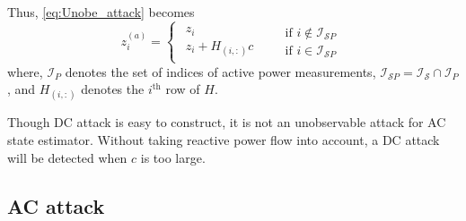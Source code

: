 \documentclass[twocolumn,english,final,journal]{IEEEtran}
\theoremstyle{plain}
\theoremstyle{definition}
\begin{document}
Thus, \eqref{eq:Unobe_attack} becomes
\begin{equation}
z_{i}^{(a)}=\begin{cases}
\begin{array}{c}
z_{i}\qquad\;\quad\;\qquad\\
z_{i}+H_{(i,:)}c
\end{array} & \begin{array}{c}
\mbox{if }i\notin\mathcal{I}_{\mathcal{S}P}\\
\mbox{if }i\in\mathcal{I}_{\mathcal{S}P}
\end{array}\end{cases}\label{eq:DC_attack}
\end{equation}
where, $\mathcal{I}_{P}$ denotes the set of indices of active power
measurements, $\mathcal{I}_{\mathcal{S}P}=\mathcal{I}_{\mathcal{S}}\cap\mathcal{I}_{P}$,
and $H_{(i,:)}$ denotes the $i^{\mbox{th}}$ row of $H$.

Though DC attack is easy to construct, it is not an unobservable attack
for AC state estimator. Without taking reactive power flow into account,
a DC attack will be detected when $c$ is too large.

\subsection{AC attack \label{sub:AC-attack}}
\end{document}
